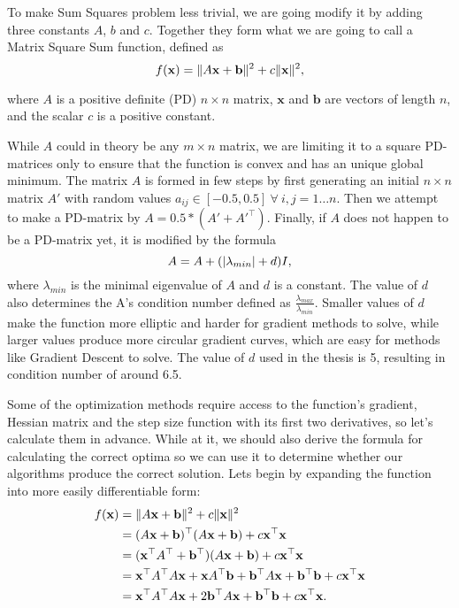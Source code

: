 \documentclass[a4paper,english,titlepage,12pt]{article}
\newcommand{\vect}[1]{\ensuremath{\mathbf{#1}}}
\newcommand{\trans}[1]{\ensuremath\vect{#1}^\top}
\newcommand{\norm}[1]{\ensuremath\Vert #1 \Vert}
\newcommand{\abs}[1]{\ensuremath|#1|}
\begin{document}
To make Sum Squares problem less trivial, we are going modify it by adding three constants $A$, $b$ and $c$. Together they form what we are going to call a Matrix Square Sum function, defined as
\begin{equation}
    f(\vect{x}) = \norm{A \vect{x} + \vect{b}} ^ 2 + c \norm{\vect{x}} ^ 2,
\end{equation}

where $A$ is a positive definite (PD) $n \times n$ matrix, $\vect{x}$ and $\vect{b}$ are vectors of length $n$, and the scalar $c$ is a positive constant.

While $A$ could in theory be any $m \times n$ matrix, we are limiting it to a square PD-matrices only to ensure that the function is convex and has an unique global minimum. The matrix $A$ is formed in few steps by first generating an initial $n \times n$ matrix $A'$ with random values $a_{ij} \in [-0.5, 0.5]\ \forall\ i,j = 1 \dots n$. Then we attempt to make a PD-matrix by $A = 0.5 * (A' + A'^\top)$. Finally, if  $A$ does not happen to be a PD-matrix yet, it is modified by the formula 
\begin{equation}
    A = A + (\abs{\lambda_{min}} + d) I,
\end{equation}
where $\lambda_{min}$ is the minimal eigenvalue of $A$ and $d$ is a constant. The value of $d$ also determines the A's condition number defined as $\frac{\lambda_{max}}{\lambda_{min}}$. Smaller values of $d$ make the function more elliptic and harder for gradient methods to solve, while larger values produce more circular gradient curves, which are easy for methods like Gradient Descent to solve. The value of $d$ used in the thesis is 5, resulting in condition number of around 6.5.

Some of the optimization methods require access to the function's gradient, Hessian matrix and the step size function with its first two derivatives, so let's calculate them in advance. While at it, we should also derive the formula for calculating the correct optima so we can use it to determine whether our algorithms produce the correct solution. Lets begin by expanding the function into more easily differentiable form:
\begin{align*}
    f(\vect{x}) &= \norm{A \vect{x} + \vect{b}} ^ 2 + c \norm{\vect{x}} ^ 2 \\
               &= (A \vect{x} + \vect{b})^\top(A \vect{x} + \vect{b}) + c \trans{x} \vect{x} \\
               &= (\trans{x} A^\top + \trans{b})(A\vect{x} + \vect{b}) + c \trans{x} \vect{x} \\
               &= \trans{x} A^\top A \vect{x} + \vect{x} A^\top \vect{b} + \trans{b} A \vect{x} + \trans{b} \vect{b} + c \trans{x} \vect{x} \\
               &= \trans{x} A^\top A \vect{x} + 2 \trans{b} A \vect{x} + \trans{b} \vect{b} + c \trans{x} \vect{x}.
\end{align*}
\end{document}
